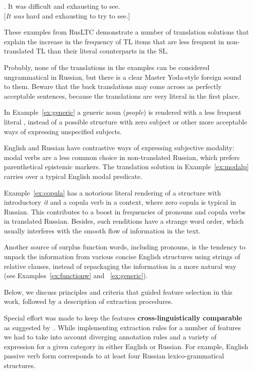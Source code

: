 \ex. \label{ex:copula}\hspace{1pt}
It was difficult and exhausting to see. \\
 [\textit{It was} hard and exhausting to try to see.]

\noindent These examples from RusLTC demonstrate a number of translation solutions that explain the
increase in the frequency of TL items that are less frequent in non-translated TL
than their literal counterparts in the SL.

Probably, none of the translations in the examples can be considered ungrammatical in Russian, but there
is a clear Master Yoda-style foreign sound to them. Beware that the back translations may come across as perfectly acceptable sentences, because the translations are very literal in the first place.

In Example~\cref{ex:generic} a generic noun (\textit{people}) is rendered with a less frequent literal , instead of a possible structure with zero subject or other more acceptable ways of expressing unspecified subjects. 

English and Russian have contrastive ways of expressing subjective modality: modal verbs are a less common choice in non-translated Russian, which prefers parenthetical epistemic markers. The translation solution in Example~\cref{ex:modalp} carries over a typical English modal predicate. 

Example~\cref{ex:copula} has a notorious literal rendering of a structure with introductory \textit{it} and a copula verb in a context, where zero copula is typical in Russian. This contributes to a boost in frequencies of pronouns and copula verbs in translated Russian. Besides, such renditions have a strange word order, which usually interferes with the smooth flow of information in the text.

Another source of surplus function words, including pronouns, is the tendency to unpack the information from various concise English structures using strings of relative clauses, instead of repackaging the information in a more natural way (see Examples~\cref{ex:functionw} and ~\cref{ex:generic}). 

Below, we discuss principles and criteria that guided feature selection in this work, followed by a description of extraction procedures. 

Special effort was made to keep the features \textbf{cross-linguistically comparable} as suggested by~\citet{Evert2017}. 
While implementing extraction rules for a number of features we had to take into account diverging annotation rules and a variety of expression for a given category in either English or Russian. For example, English passive verb form corresponds to at least four Russian lexico-grammatical structures. 

